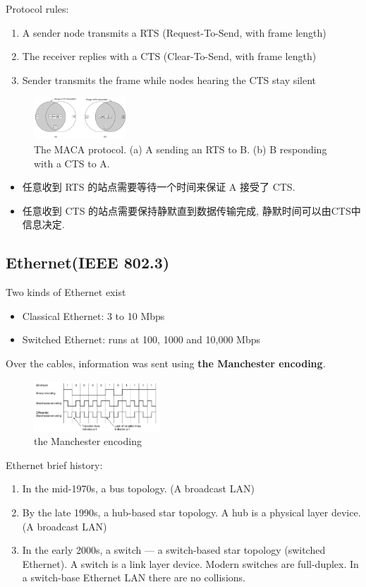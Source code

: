 Protocol rules:
\begin{enumerate}
    \item A sender node transmits a RTS (Request-To-Send, with frame length)
    \item The receiver replies with a CTS (Clear-To-Send, with frame length)
    \item Sender transmits the frame while nodes hearing the CTS stay silent
\end{enumerate}

\begin{figure}[!htb]
    \centering
    \includegraphics[width=0.309\textwidth]{pic/CN4/The MACA protocol.}
    \caption{The MACA protocol. (a) A sending an RTS to B. (b) B responding with a CTS to A.}
\end{figure}
\begin{itemize}
    \item 任意收到 RTS 的站点需要等待一个时间来保证 A 接受了 CTS. 
    \item 任意收到 CTS 的站点需要保持静默直到数据传输完成, 静默时间可以由CTS中信息决定. 
\end{itemize}

\subsection{Ethernet(IEEE 802.3)}
Two kinds of Ethernet exist
\begin{itemize}
    \item Classical Ethernet: 3 to 10 Mbps
    \item Switched Ethernet: runs at 100, 1000 and 10,000 Mbps
\end{itemize}
Over the cables, information was sent using \textbf{the Manchester encoding}.
\begin{figure}[!htb]
    \centering
    \includegraphics[width=0.42\textwidth]{pic/CN4/the Manchester encoding}
    \caption{the Manchester encoding}
\end{figure}

Ethernet brief history:
\begin{enumerate}
    \item In the mid-1970s, a bus topology. (A broadcast LAN)
    \item By the late 1990s, a hub-based star topology. A hub is a physical layer device. (A broadcast LAN)
    \item In the early 2000s, a switch --- a switch-based star topology (switched Ethernet). A switch is a link layer device. Modern switches are full-duplex. In a switch-base Ethernet LAN there are no collisions. 
\end{enumerate}


